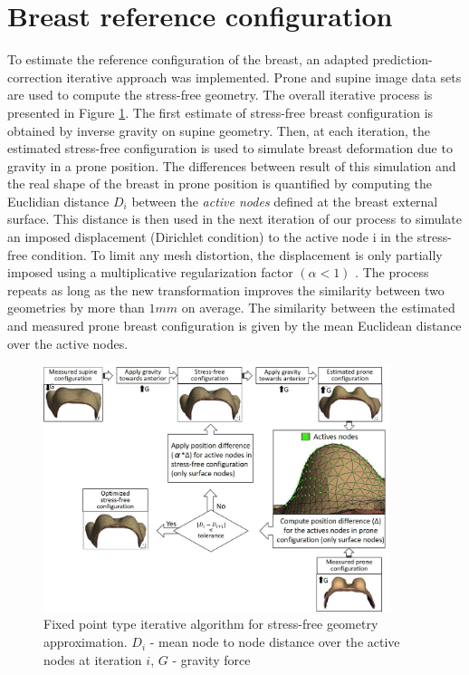 \section{Breast reference configuration}\label{section:myStressFree}
To estimate the reference configuration of the breast, an adapted prediction-correction iterative approach was implemented. Prone and supine image data sets are used to compute the stress-free geometry. The overall iterative process is presented in Figure \ref{fig:myfixedpointalgo}. The first estimate of stress-free breast configuration is obtained by inverse gravity on supine geometry. Then, at each iteration, the estimated stress-free configuration is used to simulate breast deformation due to gravity in a prone position. The differences between result of this simulation and the real shape of the breast in prone position is quantified by computing the Euclidian distance $D_i$ between the \textit{active nodes} defined at the breast external surface. This distance is then used in the next iteration of our process to simulate an imposed displacement (Dirichlet condition) to the active node i in the stress-free condition. To limit any mesh distortion, the displacement is only partially imposed using a multiplicative regularization factor $ (\alpha <1)$ . The process repeats as long as the new transformation improves the similarity between two geometries by more than $1mm$ on average. The similarity between the estimated and measured prone breast configuration is given by the mean Euclidean distance over the active nodes.                                                              

\begin{figure}[!h]
\centering
\includegraphics[width=0.9\textwidth,keepaspectratio]{figures/stress_free_config_algo.jpg} 
\caption{Fixed point type iterative algorithm for stress-free geometry approximation. $D_i$ - mean node to node distance over the active nodes at iteration $i$, $G$ - gravity force}\label{fig:myfixedpointalgo}
\end{figure}

